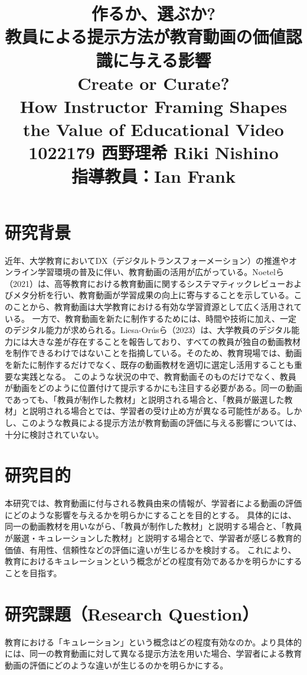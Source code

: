 \documentclass[a4paper,10pt]{ltjsarticle}
\title{作るか、選ぶか?\\教員による提示方法が教育動画の価値認識に与える影響\\
\large Create or Curate?\\ How Instructor Framing Shapes the Value of Educational Video\\
1022179 西野理希 Riki Nishino\\
指導教員：Ian Frank}
\author{}
\date{}
\begin{document}
\maketitle

\section{研究背景}

近年、大学教育においてDX（デジタルトランスフォーメーション）の推進やオンライン学習環境の普及に伴い、教育動画の活用が広がっている。Noetelら（2021）は、高等教育における教育動画に関するシステマティックレビューおよびメタ分析を行い、教育動画が学習成果の向上に寄与することを示している。このことから、教育動画は大学教育における有効な学習資源として広く活用されている。
一方で、教育動画を新たに制作するためには、時間や技術に加え、一定のデジタル能力が求められる。Liesa-Orúsら（2023）は、大学教員のデジタル能力には大きな差が存在することを報告しており、すべての教員が独自の動画教材を制作できるわけではないことを指摘している。そのため、教育現場では、動画を新たに制作するだけでなく、既存の動画教材を適切に選定し活用することも重要な実践となる。
このような状況の中で、教育動画そのものだけでなく、教員が動画をどのように位置付けて提示するかにも注目する必要がある。同一の動画であっても、「教員が制作した教材」と説明される場合と、「教員が厳選した教材」と説明される場合とでは、学習者の受け止め方が異なる可能性がある。しかし、このような教員による提示方法が教育動画の評価に与える影響については、十分に検討されていない。

\section{研究目的}

本研究では、教育動画に付与される教員由来の情報が、学習者による動画の評価にどのような影響を与えるかを明らかにすることを目的とする。
具体的には、同一の動画教材を用いながら、「教員が制作した教材」と説明する場合と、「教員が厳選・キュレーションした教材」と説明する場合とで、学習者が感じる教育的価値、有用性、信頼性などの評価に違いが生じるかを検討する。
これにより、教育におけるキュレーションという概念がどの程度有効であるかを明らかにすることを目指す。

\section{研究課題（Research Question）}

教育における「キュレーション」という概念はどの程度有効なのか。より具体的には、同一の教育動画に対して異なる提示方法を用いた場合、学習者による教育動画の評価にどのような違いが生じるのかを明らかにする。
\end{document}
